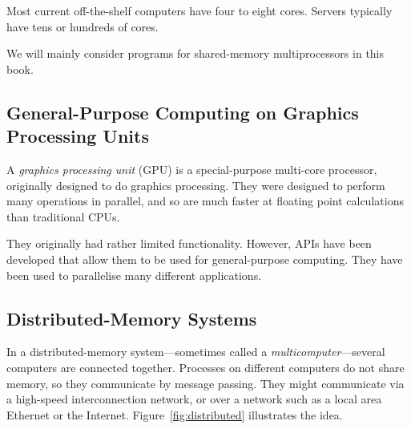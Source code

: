 Most current off-the-shelf computers have four to eight cores.  Servers
typically have tens or hundreds of cores.

We will mainly consider programs for shared-memory multiprocessors in this
book.
 


\subsection{General-Purpose Computing on Graphics Processing Units}


A \emph{graphics processing unit} (GPU) is a special-purpose multi-core
processor, originally designed to do graphics processing.  They were designed
to perform many operations in parallel, and so are much faster at floating
point calculations than traditional CPUs.

They originally had rather limited functionality.  However, APIs have
been developed that allow them to be used for general-purpose computing.  They
have been used to parallelise many different
applications.


\subsection{Distributed-Memory Systems}

In a distributed-memory system---sometimes
called a \emph{multicomputer}---several computers are connected together.
Processes on different computers do not share memory, so they communicate by
message passing.  They might communicate via a high-speed interconnection
network, or over a network such as a local area Ethernet or the Internet.
Figure~\ref{fig:distributed} illustrates the idea.


